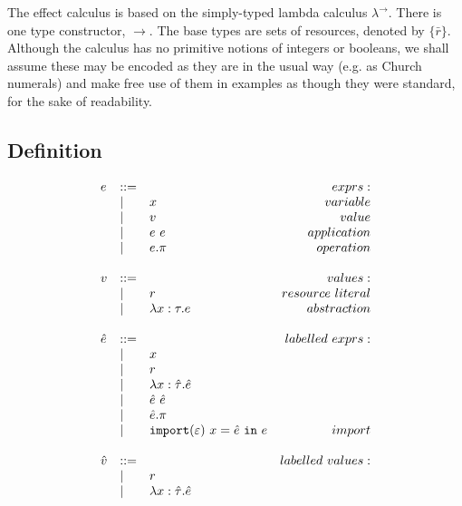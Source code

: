 The effect calculus is based on the simply-typed lambda calculus $\lambda^{\rightarrow}$. There is one type constructor, $\rightarrow$. The base types are sets of resources, denoted by $\{ \bar r \}$. Although the calculus has no primitive notions of integers or booleans, we shall assume these may be encoded as they are in the usual way (e.g. as Church numerals) and make free use of them in examples as though they were standard, for the sake of readability.

\subsection{Definition}

\begin{figure}[h]
\vspace{-5pt}

\[
\begin{array}{lll}

\begin{array}{lllr}

e & ::= & ~ & exprs: \\
	& | & x & variable \\
	& | & v & value \\
	& | & e ~ e & application \\
	& | & e.\pi & operation \\
	&&\\

v & ::= & ~ & values: \\
	& | & r & resource~literal \\
	& | & \lambda x: \tau.e & abstraction \\
	&&\\
	
\hat e & ::= & ~ & labelled~exprs: \\
	& | & x \\
	& | & r \\
	& | & \lambda x: \hat \tau.\hat e \\
	& | & \hat e ~ \hat e \\
	& | & \hat e.\pi \\
	& | & \mathtt{import}(\varepsilon)~x = \hat e~\mathtt{in}~e & import \\
	&&\\

\hat v & ::= & ~ & labelled~values: \\
	& | & r \\
	& | & \lambda x: \hat \tau.\hat e \\
	&&\\


\end{array}
\end{array}\]
\end{figure}
